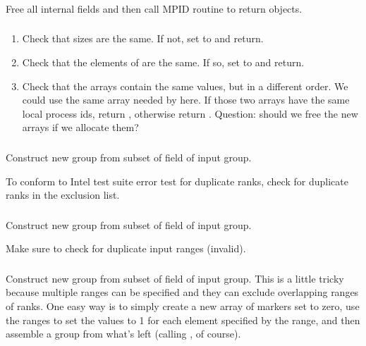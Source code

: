 \documentclass{article}
\begin{document}
\subsubsection{}
Free all internal fields and then call MPID routine to return objects.

\subsubsection{}
\begin{enumerate}
\item Check that sizes are the same.  If not, set  to
   and return.
\item Check that the elements of  are the same.  If so,
set  to  and return.
\item Check that the  arrays contain the same values, but
  in a different order.  We could use the same array needed by
   here.  If those two arrays have the same
  local process ids, return , otherwise return
  .  Question: should we free the new arrays if we
  allocate them?
\end{enumerate}

\subsubsection{}
\begin{adi3}
  Construct new group from subset of  field of
  input group.

  To conform to Intel test suite error test for duplicate ranks, check for 
  duplicate ranks in the exclusion list.
\end{adi3}

\subsubsection{}
\begin{adi3}
  Construct new group from subset of  field of
  input group.

  Make sure to check for duplicate input ranges (invalid).
\end{adi3}

\subsubsection{}
\begin{adi3}
  Construct new group from subset of  field of
  input group.  This is a little tricky because multiple ranges can be
  specified and they can exclude overlapping ranges of ranks.  One easy way is
  to simply create a new array of markers set to zero, use the ranges to set
  the values to 1 for each element specified by the range, and then assemble
  a group from what's left (calling , of course).
\end{adi3}
\end{document}
